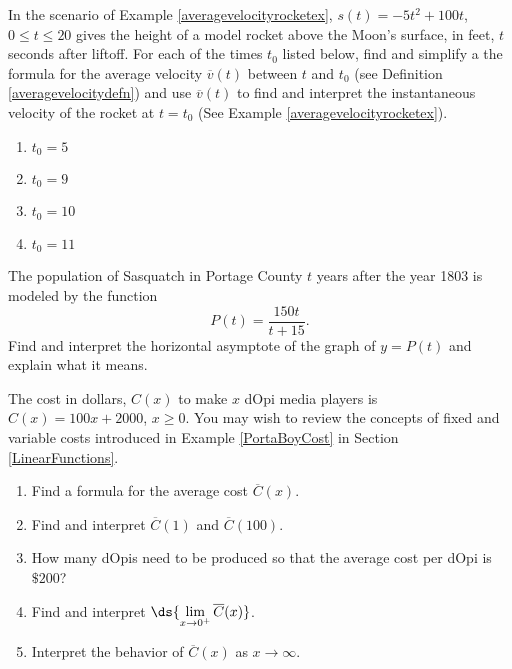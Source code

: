 \documentclass{ximera}
\begin{document}
\begin{problem}
In the scenario of  Example \ref{averagevelocityrocketex}, $s(t) = -5t^2+100t$, $0 \leq t \leq 20$ gives the height of a model rocket above the Moon's surface, in feet,  $t$ seconds after liftoff.  For each of the times $t_{0}$ listed below, find and simplify a the formula for the average velocity $\overline{v}(t)$ between $t$ and $t_{0}$ (see Definition \ref{averagevelocitydefn}) and use $\overline{v}(t)$ to find and interpret the instantaneous velocity of the rocket at $t = t_{0}$ (See Example \ref{averagevelocityrocketex}).

\begin{enumerate}

\item  $t_{0} = 5$

\item $t_{0} = 9$

\item $t_{0} = 10$

\item  $t_{0} = 11$

\end{enumerate}
\end{problem}

\begin{problem}\label{squatchpop}
The population of Sasquatch in Portage County $t$ years after the year 1803 is modeled by the function \[P(t) = \frac{150t}{t + 15}.\] Find and interpret the horizontal asymptote of the graph of $y = P(t)$ and explain what it means.
\end{problem}

\begin{problem}
The cost in dollars, $C(x)$ to make $x$ dOpi media players is $C(x) = 100x+2000$, $x \geq 0$.  You may wish to review the concepts of fixed and variable costs introduced in  Example \ref{PortaBoyCost} in Section \ref{LinearFunctions}.

\begin{enumerate}

\item  Find a formula for the average cost $\overline{C}(x)$.

\item  Find and interpret $\overline{C}(1)$ and $\overline{C}(100)$.

\item  How many dOpis need to be produced so that the average cost per dOpi is $\$ 200$?

\item  Find and interpret $\ds{ \lim_{x \rightarrow 0^{+}} \overline{C}(x)}$.

\item  Interpret the behavior of $\overline{C}(x)$ as $x \rightarrow \infty$.

\end{enumerate}
\end{problem}
\end{document}
